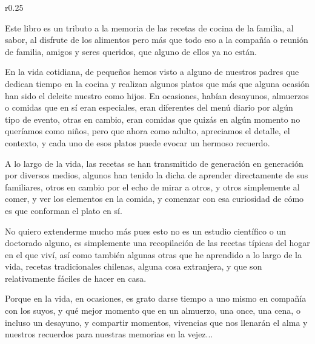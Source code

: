 \thispagestyle{empty}

\begin{wrapfigure}{r}{0.25\textwidth}
\end{wrapfigure} 

Este libro es un tributo a la memoria de las recetas de cocina de la familia, al sabor, al disfrute de los alimentos pero más que todo eso a la compañía o reunión de familia, amigos y seres queridos, que alguno de ellos
ya no están. 

En la vida cotidiana, de pequeños hemos visto a alguno de nuestros padres que dedican tiempo en la cocina y realizan algunos platos que más que alguna ocasión han sido el deleite nuestro como hijos. En ocasiones, habían desayunos, almuerzos o comidas que en sí eran especiales, eran diferentes del menú diario por algún tipo de evento, otras en cambio, eran comidas que quizás en algún momento no queríamos como niños, pero que ahora como adulto, apreciamos el detalle, el contexto, y cada uno de esos platos puede evocar un hermoso recuerdo.

A lo largo de la vida, las recetas se han transmitido de generación en generación por diversos medios, algunos han tenido la dicha de aprender directamente de sus familiares, otros en cambio por el echo de mirar a otros, y otros simplemente al comer, y ver los elementos en la comida, y comenzar con esa curiosidad de cómo es que conforman el plato en sí. 

No quiero extenderme mucho más pues esto no es un estudio científico o un doctorado alguno, es simplemente una recopilación de las recetas típicas del hogar en el que viví, así como también algunas otras que he aprendido a lo largo de la vida, recetas tradicionales chilenas, alguna cosa extranjera, y que son relativamente fáciles de hacer en casa.

Porque en la vida, en ocasiones, es grato darse tiempo a uno mismo en compañía con los suyos, y qué mejor momento que en un almuerzo, una once, una cena, o incluso un desayuno, y compartir momentos, vivencias que nos llenarán el alma y nuestros recuerdos para nuestras memorias en la vejez...

